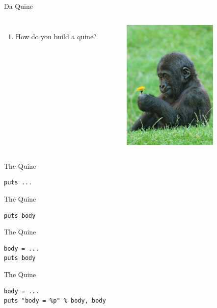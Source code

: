 \documentclass[pdf,14pt]{beamer}
\begin{document}
\begin{frame}{Da Quine}
  \begin{columns}
    \begin{enumerate}
    \item How do you build a quine?
    \end{enumerate}

    \begin{figure}[ht]
      \begin{center}
        \includegraphics[height=6.5cm]{ape.jpeg}
      \end{center}
    \end{figure}    
  \end{columns}
\end{frame}

\begin{frame}[fragile]{The Quine}
\begin{verbatim}
puts ...
\end{verbatim}
\end{frame}

\begin{frame}[fragile]{The Quine}
\begin{verbatim}
puts body
\end{verbatim}
\end{frame}

\begin{frame}[fragile]{The Quine}
\begin{verbatim}
body = ...
puts body
\end{verbatim}
\end{frame}

\begin{frame}[fragile]{The Quine}
\begin{verbatim}
body = ...
puts "body = %p" % body, body
\end{verbatim}
\end{frame}
\end{document}
